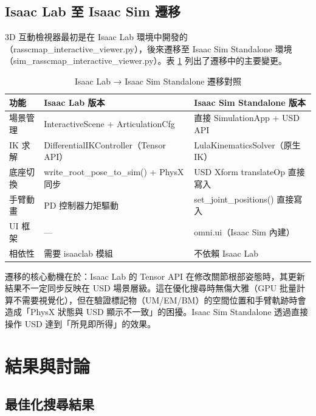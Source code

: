 \documentclass[a4paper, 12pt]{article}
\begin{document}
\subsection{Isaac Lab 至 Isaac Sim 遷移}
\label{subsec:migration}

3D 互動檢視器最初是在 Isaac Lab 環境中開發的（rasscmap\_interactive\_viewer.py），後來遷移至 Isaac Sim Standalone 環境（sim\_rasscmap\_interactive\_viewer.py）。表 \ref{tab:migration_detail} 列出了遷移中的主要變更。

\begin{table}[H]
\centering
\caption{Isaac Lab → Isaac Sim Standalone 遷移對照}
\label{tab:migration_detail}
\small
\begin{tabularx}{\textwidth}{l X X}
\toprule
\textbf{功能} & \textbf{Isaac Lab 版本} & \textbf{Isaac Sim Standalone 版本} \\
\midrule
場景管理 & InteractiveScene + ArticulationCfg & 直接 SimulationApp + USD API \\
\addlinespace
IK 求解 & DifferentialIKController（Tensor API） & LulaKinematicsSolver（原生 IK） \\
\addlinespace
底座切換 & write\_root\_pose\_to\_sim() + PhysX 同步 & USD Xform translateOp 直接寫入 \\
\addlinespace
手臂動畫 & PD 控制器力矩驅動 & set\_joint\_positions() 直接寫入 \\
\addlinespace
UI 框架 & — & omni.ui（Isaac Sim 內建） \\
\addlinespace
相依性 & 需要 isaaclab 模組 & 不依賴 Isaac Lab \\
\bottomrule
\end{tabularx}
\end{table}

遷移的核心動機在於：Isaac Lab 的 Tensor API 在修改關節根部姿態時，其更新結果不一定同步反映在 USD 場景層級。這在優化搜尋時無傷大雅（GPU 批量計算不需要視覺化），但在驗證標記物（UM/EM/BM）的空間位置和手臂軌跡時會造成「PhysX 狀態與 USD 顯示不一致」的困擾。Isaac Sim Standalone 透過直接操作 USD 達到「所見即所得」的效果。

\section{結果與討論}
\label{sec:results}

\subsection{最佳化搜尋結果}
\label{subsec:optimization_results}
\end{document}
